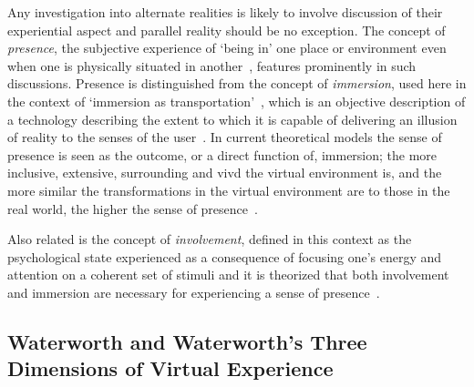 \label{lit-review-presencec}
Any investigation into alternate realities is likely to involve discussion of their experiential aspect and parallel reality should be no exception. The concept of \textit{presence}, the subjective experience of `being in' one place or environment even when one is physically situated in another~\cite{Witmer1998}, features prominently in such discussions. Presence is distinguished from the concept of \textit{immersion}, used here in the context of `immersion as transportation'~\cite{Calleja2014}, which is an objective description of a technology describing the extent to which it is capable of delivering an illusion of reality to the senses of the user~\cite{Slater1997}. In current theoretical models the sense of presence is seen as the outcome, or a direct function of, immersion; the more inclusive, extensive, surrounding and vivd the virtual environment is, and the more similar the transformations in the virtual environment are to those in the real world, the higher the sense of presence~\cite{Constantin2003}.

Also related is the concept of \textit{involvement}, defined in this context as the psychological state experienced as a consequence of focusing one's energy and attention on a coherent set of stimuli and it is theorized that both involvement and immersion are necessary for experiencing a sense of presence~\cite{Witmer1998}.

\subsection{Waterworth and Waterworth's Three Dimensions of Virtual Experience}
\label{waterworthandwaterworth}
\newcommand{\presencefootnote}{\footnote{\textbf{Presence} in the context of this model is defined as a state of heightened perceptual processing of environmental stimuli (\textit{``a psychological focus on direct perceptual processing''}~\cite{Waterworth2001}) accompanied by lessened conceptual reasoning, covering cases both in which the environmental stimuli originate from the subject's immediate real surroundings (\textit{unmediated presence}) and when the environmental stimuli originate from a remote real environment, virtual environment or mixed reality environment (\textit{mediated presence})~\cite{Mantovani2010}.}}

\newcommand{\absencefootnote}{\footnote{\textbf{Absence} is defined as \textit{``a psychological focus on \ldots\ conceptual processing''}~\cite{Waterworth2001}, as \textit{``presence in an exclusively mental activity''}~\cite{Giuseppe2014}, with total presence (in the above definition) and total absence representing opposite poles along the continuum of the focus of attention axis~\cite{Mantovani2010}.}}

